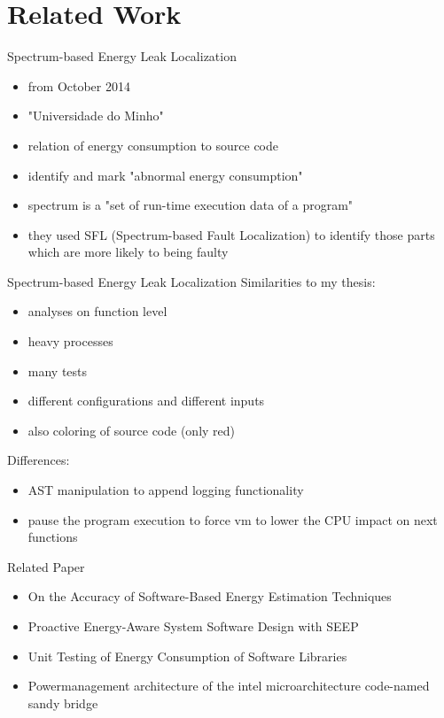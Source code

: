 \documentclass[11pt,aspectratio=169]{beamer}
\begin{document}
\section{Related Work}

\begin{frame}{Spectrum-based Energy Leak Localization}
  \begin{itemize}
    \item from October 2014
    \item "Universidade do Minho"
    \item relation of energy consumption to source code
    \item identify and mark "abnormal energy consumption"
    \item spectrum is a "set of run-time execution data of a program"
    \item they used SFL (Spectrum-based Fault Localization) to identify those parts which are more likely to being faulty
  \end{itemize}
\end{frame}

\begin{frame}{Spectrum-based Energy Leak Localization}
  Similarities to my thesis:
  \begin{itemize}
    \item analyses on function level
    \item heavy processes
    \item many tests 
    \item different configurations and different inputs
    \item also coloring of source code (only red)
  \end{itemize}
  Differences:
  \begin{itemize}
    \item AST manipulation to append logging functionality
    \item pause the program execution to force vm to lower the CPU impact on next functions
  \end{itemize}
\end{frame}

\begin{frame}{Related Paper}
  \begin{itemize}
    \item On the Accuracy of Software-Based Energy Estimation Techniques

    \item Proactive Energy-Aware System Software Design with SEEP

    \item Unit Testing of Energy Consumption of Software Libraries

    \item Powermanagement architecture of the intel microarchitecture code-named sandy bridge
  \end{itemize}
\end{frame}
\end{document}
